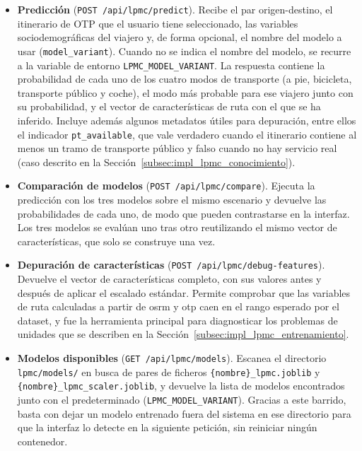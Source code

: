 \begin{itemize}
  \item \textbf{Predicción} (\texttt{POST /api/lpmc/predict}). Recibe el par origen-destino, el itinerario de OTP que el usuario tiene seleccionado, las variables sociodemográficas del viajero y, de forma opcional, el nombre del modelo a usar (\texttt{model\_variant}). Cuando no se indica el nombre del modelo, se recurre a la variable de entorno \texttt{LPMC\_MODEL\_VARIANT}. La respuesta contiene la probabilidad de cada uno de los cuatro modos de transporte (a pie, bicicleta, transporte público y coche), el modo más probable para ese viajero junto con su probabilidad, y el vector de características de ruta con el que se ha inferido. Incluye además algunos metadatos útiles para depuración, entre ellos el indicador \texttt{pt\_available}, que vale verdadero cuando el itinerario contiene al menos un tramo de transporte público y falso cuando no hay servicio real (caso descrito en la Sección~\ref{subsec:impl_lpmc_conocimiento}).

  \item \textbf{Comparación de modelos} (\texttt{POST /api/lpmc/compare}). Ejecuta la predicción con los tres modelos sobre el mismo escenario y devuelve las probabilidades de cada uno, de modo que pueden contrastarse en la interfaz. Los tres modelos se evalúan uno tras otro reutilizando el mismo vector de características, que solo se construye una vez.

  \item \textbf{Depuración de características} (\texttt{POST /api/lpmc/debug-features}). Devuelve el vector de características completo, con sus valores antes y después de aplicar el escalado estándar. Permite comprobar que las variables de ruta calculadas a partir de \gls{osrm} y \gls{otp} caen en el rango esperado por el dataset, y fue la herramienta principal para diagnosticar los problemas de unidades que se describen en la Sección~\ref{subsec:impl_lpmc_entrenamiento}.

  \item \textbf{Modelos disponibles} (\texttt{GET /api/lpmc/models}). Escanea el directorio \texttt{lpmc/models/} en busca de pares de ficheros \texttt{\{nombre\}\_lpmc.joblib} y \texttt{\{nombre\}\_lpmc\_scaler.joblib}, y devuelve la lista de modelos encontrados junto con el predeterminado (\texttt{LPMC\_MODEL\_VARIANT}). Gracias a este barrido, basta con dejar un modelo entrenado fuera del sistema en ese directorio para que la interfaz lo detecte en la siguiente petición, sin reiniciar ningún contenedor.
\end{itemize}

